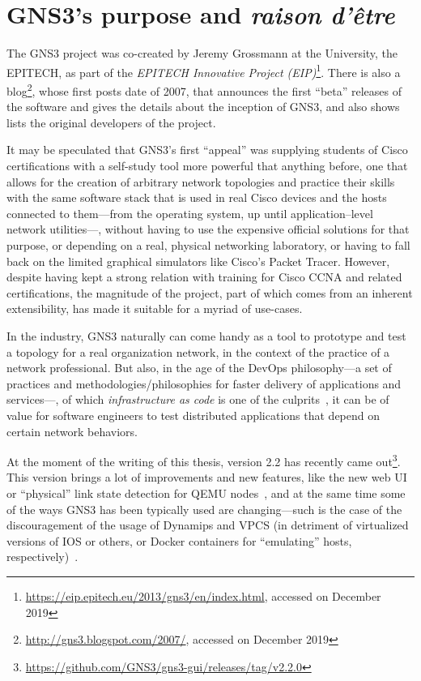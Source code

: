 
\section{GNS3's purpose and \emph{raison d'être}}
\label{sec:gns3why}

The GNS3 project was co-created by Jeremy Grossmann at the University, the EPITECH, as part of the \emph{EPITECH Innovative Project (EIP)}\footnote{\url{https://eip.epitech.eu/2013/gns3/en/index.html}, accessed on December 2019}.
There is also a blog\footnote{\url{http://gns3.blogspot.com/2007/}, accessed on December 2019}, whose first posts date of 2007, that announces the first ``beta'' releases of the software and gives the details about the inception of GNS3, and also shows lists the original developers of the project.

It may be speculated that GNS3's first ``appeal'' was supplying students of Cisco certifications with a self-study tool more powerful that anything before, one that allows for the creation of arbitrary network topologies and practice their skills with the same software stack that is used in real Cisco devices and the hosts connected to them---from the operating system, up until application--level network utilities---, without having to use the expensive official solutions for that purpose, or depending on a real, physical networking laboratory, or having to fall back on the limited graphical simulators like Cisco's Packet Tracer.
However, despite having kept a strong relation with training for Cisco CCNA and related certifications, the magnitude of the project, part of which comes from an inherent extensibility, has made it suitable for a myriad of use-cases.

In the industry, GNS3 naturally can come handy as a tool to prototype and test a topology for a real organization network, in the context of the practice of a network professional.
But also, in the age of the DevOps philosophy---a set of practices and methodologies/philosophies for faster delivery of applications and services---, of which \emph{infrastructure as code} is one of the culprits~\cite{awswhatisdevops}, it can be of value for software engineers to test distributed applications that depend on certain network behaviors. %

At the moment of the writing of this thesis, version 2.2 has recently came out\footnote{\url{https://github.com/GNS3/gns3-gui/releases/tag/v2.2.0}}.
This version brings a lot of improvements and new features, like the new web UI or ``physical'' link state detection for QEMU nodes~\cite{releasenotesgns3v22}, and at the same time some of the ways GNS3 has been typically used are changing---such is the case of the discouragement of the usage of Dynamips and VPCS (in detriment of virtualized versions of IOS or others, or Docker containers for ``emulating'' hosts, respectively)~\cite{ytdynamipsvpcs}.

